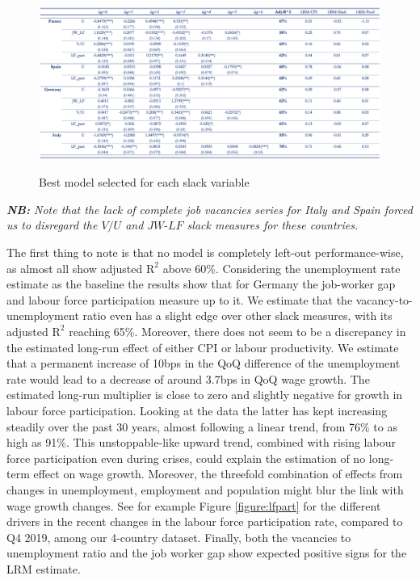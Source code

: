 \begin{figure}[H]
    \centering
    \caption{Best model selected for each slack variable}
    \includegraphics[width=1\textwidth]{Core/2.Labour/img/LRM table.png}
    \label{figure:lrm_table}
\end{figure}
\vspace{-1.5cm}
\noindent \textit{\textbf{NB:} Note that the lack of complete job vacancies series for Italy and Spain forced us to disregard the $V/U$ and $JW\textrm{-}LF$ slack measures for these countries.}

\quad The first thing to note is that no model is completely left-out performance-wise, as almost all show adjusted $\textrm{R}^{2}$ above 60\%. 
Considering the unemployment rate estimate as the baseline the results show that for Germany the job-worker gap and labour force participation measure up to it. 
We estimate that the vacancy-to-unemployment ratio even has a slight edge over other slack measures, with its adjusted $\textrm{R}^{2}$ reaching 65\%. 
Moreover, there does not seem to be a discrepancy in the estimated long-run effect of either CPI or labour productivity. 
We estimate that a permanent increase of 10bps in the QoQ difference of the unemployment rate would lead to a decrease of around 3.7bps in QoQ wage growth. 
The estimated long-run multiplier is close to zero and slightly negative for growth in labour force participation. 
Looking at the data the latter has kept increasing steadily over the past 30 years, almost following a linear trend, from 76\% to as high as 91\%. 
This unstoppable-like upward trend, combined with rising labour force participation even during crises, could explain the estimation of no long-term effect on wage growth. 
Moreover, the threefold combination of effects from changes in unemployment, employment and population might blur the link with wage growth changes. 
See for example Figure \ref{figure:lfpart} for the different drivers in the recent changes in the labour force participation rate, compared to Q4 2019, among our 4-country dataset. 
Finally, both the vacancies to unemployment ratio and the job worker gap show expected positive signs for the LRM estimate. 

